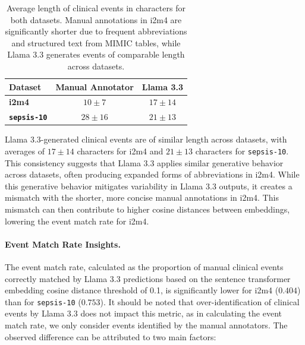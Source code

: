 \documentclass[pmlr,twocolumn,10pt]{jmlr} %
\begin{document}
\begin{table}[ht]
\centering
\begin{tabular}{|l|c|c|}
\hline
\textbf{Dataset} & \textbf{Manual Annotator} & \textbf{Llama 3.3} \\ \hline
\textbf{i2m4}    & $10\pm7 $                              & $17\pm14$                        \\ \hline
\textbf{\texttt{sepsis-10}} & $28\pm16$                            & $21\pm13$                        \\ \hline
\end{tabular}
\caption{Average length of clinical events in characters for both datasets. Manual annotations in i2m4 are significantly shorter due to frequent abbreviations and structured text from MIMIC tables, while Llama 3.3 generates events of comparable length across datasets.}
\label{tab:character_length}
\end{table}

Llama 3.3-generated clinical events are of similar length across datasets, with averages of $17\pm14$ characters for i2m4 and $21\pm13$ characters for \texttt{sepsis-10}. 
This consistency suggests that Llama 3.3 applies similar generative behavior across datasets, often producing expanded forms of abbreviations in i2m4. 
While this generative behavior mitigates variability in Llama 3.3 outputs, it creates a mismatch with the shorter, more concise manual annotations in i2m4. 
This mismatch can then contribute to higher cosine distances between embeddings, lowering the event match rate for i2m4.

\paragraph{Event Match Rate Insights.}
The event match rate, calculated as the proportion of manual clinical events correctly matched by Llama 3.3 predictions based on the sentence transformer embedding cosine distance threshold of 0.1, is significantly lower for i2m4 ($0.404$) than for \texttt{sepsis-10} ($0.753$). 
It should be noted that over-identification of clinical events by Llama 3.3 does not impact this metric, as in calculating the event match rate, we only consider events identified by the manual annotators. 
The observed difference can be attributed to two main factors:
\end{document}
